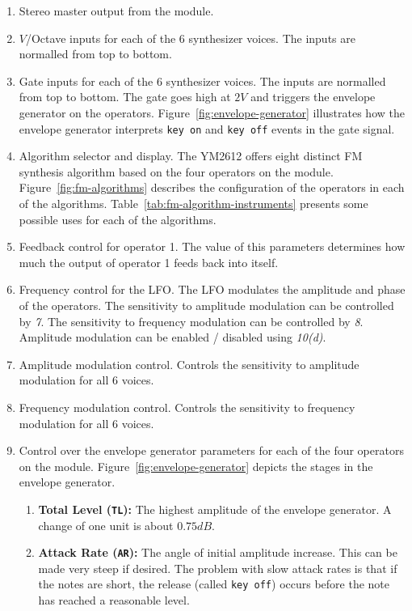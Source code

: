 \documentclass[12pt,a4paper]{article}
\begin{document}
\begin{enumerate}
  \item Stereo master output from the module.
  \item $V$/Octave inputs for each of the 6 synthesizer voices. The inputs are normalled from top to bottom.
  \item Gate inputs for each of the 6 synthesizer voices.  The inputs are normalled from top to bottom. The gate goes high at $2V$ and triggers the envelope generator on the operators. Figure~\ref{fig:envelope-generator} illustrates how the envelope generator interprets \texttt{key on} and \texttt{key off} events in the gate signal.
  \item Algorithm selector and display. The YM2612 offers eight distinct FM synthesis algorithm based on the four operators on the module. Figure~\ref{fig:fm-algorithms} describes the configuration of the operators in each of the algorithms. Table~\ref{tab:fm-algorithm-instruments} presents some possible uses for each of the algorithms.
  \item Feedback control for operator 1. The value of this parameters determines how much the output of operator 1 feeds back into itself.
  \item Frequency control for the LFO. The LFO modulates the amplitude and phase of the operators. The sensitivity to amplitude modulation can be controlled by \textit{7}. The sensitivity to frequency modulation can be controlled by \textit{8}. Amplitude modulation can be enabled / disabled using \textit{10(d)}.
  \item Amplitude modulation control. Controls the sensitivity to amplitude modulation for all 6 voices.
  \item Frequency modulation control. Controls the sensitivity to frequency modulation for all 6 voices.
\clearpage
  \item Control over the envelope generator parameters for each of the four operators on the module. Figure~\ref{fig:envelope-generator} depicts the stages in the envelope generator. \begin{enumerate}
    \item \textbf{Total Level (\texttt{TL}):} The highest amplitude of the envelope generator. A change of one unit is about $0.75dB$.
    \item \textbf{Attack Rate (\texttt{AR}):} The angle of initial amplitude increase. This can be made very steep if desired. The problem with slow attack rates is that if the notes are short, the release (called \texttt{key off}) occurs before the note has reached a reasonable level.

\end{enumerate}
\end{enumerate}
\end{document}
